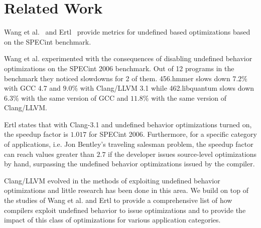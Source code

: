 \section{Related Work} \label{sec:rl}

Wang et al.~\cite{wang2012undefined} and Ertl~\cite{ertl2015every}
provide metrics for undefined based optimizations based on the SPECint
benchmark.

Wang et al. experimented with the consequences of disabling undefined
behavior optimizations on the SPECint 2006 benchmark. Out of 12 programs
in the benchmark they noticed slowdowns for 2 of them. 456.hmmer slows
down $7.2\%$ with GCC 4.7 and $9.0\%$ with Clang/LLVM 3.1 while
462.libquantum slows down $6.3\%$ with the same version of GCC and
$11.8\%$ with the same version of Clang/LLVM.

Ertl states that with Clang-3.1 and undefined behavior optimizations
turned on, the speedup factor is $1.017$ for SPECint 2006. Furthermore,
for a specific category of applications, i.e. Jon Bentley's traveling
salesman problem, the speedup factor can reach values greater than $2.7$
if the developer issues source-level optimizations by hand, surpassing
the undefined behavior optimizations issued by the compiler.

Clang/LLVM evolved in the methods of exploiting undefined behavior
optimizations and little research has been done in this area. We build
on top of the studies of Wang et al. and Ertl to provide a comprehensive
list of how compilers exploit undefined behavior to issue optimizations
and to provide the impact of this class of optimizations for various
application categories.
